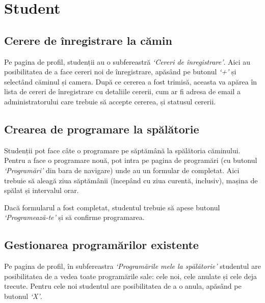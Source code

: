 \documentclass[12pt,a4paper]{report}
\theoremstyle{definition}
\theoremstyle{remark}
\begin{document}
\section{Student}

\subsection{Cerere de înregistrare la cămin}

\par Pe pagina de profil, studenții au o subfereastră \textit{`Cereri de înregistrare'}. Aici au posibilitatea de a face cereri noi de înregistrare, apăsând pe butonul \textit{`+'} și selectând căminul și camera. După ce cererea a fost trimisă, aceasta va apărea în lista de cereri de înregistrare cu detaliile cererii, cum ar fi adresa de email a administratorului care trebuie să accepte cererea, și statusul cererii.


\subsection{Crearea de programare la spălătorie}

\par Studenții pot face câte o programare pe săptămână la spălătoria căminului. Pentru a face o programare nouă, pot intra pe pagina de programări (cu butonul \textit{`Programări'} din bara de navigare) unde au un formular de completat. Aici trebuie să aleagă ziua săptămânii (începând cu ziua curentă, inclusiv), mașina de spălat și intervalul orar.

\par Dacă formularul a fost completat, studentul trebuie să apese butonul \textit{`Programează-te'} și să confirme programarea.


\subsection{Gestionarea programărilor existente}

\par Pe pagina de profil, în subfereastra \textit{`Programările mele la spălătorie'} studentul are posibilitatea de a vedea toate programările sale: cele noi, cele anulate și cele deja trecute. Pentru cele noi studentul are posibilitatea de a o anula, apăsând pe butonul \textit{`X'}.
\end{document}
